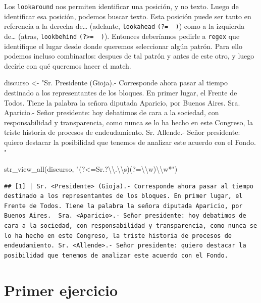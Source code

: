 \documentclass[
]{book}
\newenvironment{Shaded}{\begin{snugshade}}{\end{snugshade}}
\newcommand{\FunctionTok}[1]{\textcolor[rgb]{0.00,0.00,0.00}{#1}}
\newcommand{\NormalTok}[1]{#1}
\newcommand{\OtherTok}[1]{\textcolor[rgb]{0.56,0.35,0.01}{#1}}
\newcommand{\SpecialCharTok}[1]{\textcolor[rgb]{0.00,0.00,0.00}{#1}}
\newcommand{\StringTok}[1]{\textcolor[rgb]{0.31,0.60,0.02}{#1}}
\begin{document}
Los \texttt{lookaround} nos permiten identificar una posición, y no texto. Luego de identificar esa posición, podemos buscar texto. Esta posición puede ser tanto en referencia a la derecha de\ldots{} (adelante, \texttt{lookahead} \texttt{(?=\ \ )}) como a la izquierda de\ldots{} (atras, \texttt{lookbehind} \texttt{(?\textgreater{}=\ \ )}). Entonces deberíamos pedirle a \texttt{regex} que identifique el lugar desde donde queremos seleccionar algún patrón. Para ello podemos incluso combinarlos: despues de tal patrón y antes de este otro, y luego decirle con qué queremos hacer el match.

\begin{Shaded}
\begin{Highlighting}[]
\NormalTok{discurso }\OtherTok{\textless{}{-}} \StringTok{"Sr. Presidente (Gioja).{-} Corresponde ahora pasar al tiempo destinado a los representantes de los bloques. En primer lugar, el Frente de Todos. Tiene la palabra la señora diputada Aparicio, por Buenos Aires.  Sra. Aparicio.{-} Señor presidente: hoy debatimos de cara a la sociedad, con responsabilidad y transparencia, como nunca se lo ha hecho en este Congreso, la triste historia de procesos de endeudamiento. Sr. Allende.{-} Señor presidente: quiero destacar la posibilidad que tenemos de analizar este acuerdo con el Fondo. "}

\FunctionTok{str\_view\_all}\NormalTok{(discurso, }\StringTok{"(?\textless{}=Sr.?}\SpecialCharTok{\textbackslash{}\textbackslash{}}\StringTok{.}\SpecialCharTok{\textbackslash{}\textbackslash{}}\StringTok{s)(?=}\SpecialCharTok{\textbackslash{}\textbackslash{}}\StringTok{w)}\SpecialCharTok{\textbackslash{}\textbackslash{}}\StringTok{w*"}\NormalTok{)}
\end{Highlighting}
\end{Shaded}

\begin{verbatim}
## [1] | Sr. <Presidente> (Gioja).- Corresponde ahora pasar al tiempo destinado a los representantes de los bloques. En primer lugar, el Frente de Todos. Tiene la palabra la señora diputada Aparicio, por Buenos Aires.  Sra. <Aparicio>.- Señor presidente: hoy debatimos de cara a la sociedad, con responsabilidad y transparencia, como nunca se lo ha hecho en este Congreso, la triste historia de procesos de endeudamiento. Sr. <Allende>.- Señor presidente: quiero destacar la posibilidad que tenemos de analizar este acuerdo con el Fondo.
\end{verbatim}

\hypertarget{primer-ejercicio}{%
\section{Primer ejercicio}\label{primer-ejercicio}}
\end{document}
